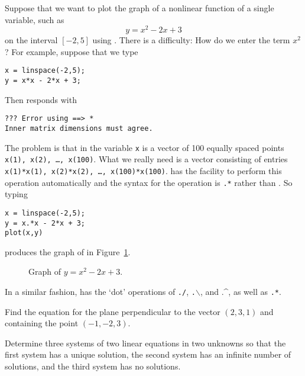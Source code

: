 \documentclass{ximera}
\begin{document}
Suppose that we want to plot the graph of a nonlinear function of
a single variable, such as
\begin{equation}  \label{E:quadex}
y = x^2 - 2x + 3
\end{equation}
on the interval $[-2,5]$ using \Matlabp.  There is a difficulty:  How
do we enter the term $x^2$?  For example, suppose that we type
\begin{verbatim}
x = linspace(-2,5);
y = x*x - 2*x + 3;
\end{verbatim}
Then \Matlab responds with
\begin{verbatim}
??? Error using ==> *
Inner matrix dimensions must agree.
\end{verbatim}
The problem is that in \Matlab the variable {\tt x} is a vector of
100 equally spaced points {\tt x(1), x(2), \ldots, x(100)}.  What we
really need is a vector consisting of entries {\tt x(1)*x(1), x(2)*x(2),
\ldots, x(100)*x(100)}.  \Matlab has the facility to perform this
operation automatically and the syntax for the operation is {\tt .*}
rather than {\tt *}.  So typing
\begin{verbatim}
x = linspace(-2,5);
y = x.*x - 2*x + 3;
plot(x,y)
\end{verbatim}
produces the graph of  in Figure~\ref{F:quadex}.
\begin{figure}[htb]
              \centerline{%
              }
              \caption{Graph of $y = x^2 - 2x + 3$.}
              \label{F:quadex}
\end{figure}
In a similar fashion, \Matlab has the `dot' operations of
{\tt ./},
{\tt .$\backslash$}, and  .\^{}, as well
as {\tt .*}.

\EXER



\TEXER

\begin{exercise} \label{c2.2.5}
Find the equation for the plane perpendicular to the vector $(2,3,1)$
and containing the point $(-1,-2,3)$.
\end{exercise}

\begin{exercise} \label{c2.2.6}
Determine three systems of two linear equations in two unknowns
so that the first system has a unique solution, the second
system has an infinite number of solutions, and the third system
has no solutions.
\end{exercise}
\end{document}
